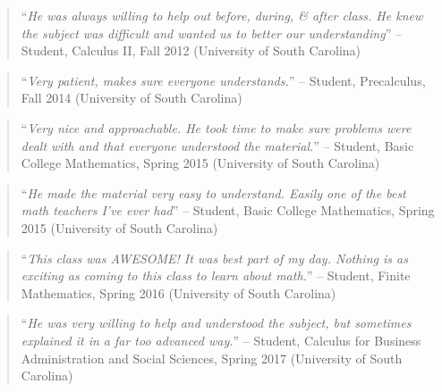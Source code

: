 \documentclass[teaching.portfolio.tex]{subfiles}
\begin{document}
\begin{quotation}
  ``\textit{He was always willing to help out before, during, \& after class.  He knew the subject was difficult and wanted us to better our understanding}'' -- Student, Calculus II, Fall 2012 (University of South Carolina)
\end{quotation}

\begin{quotation}
  ``\textit{Very patient, makes sure everyone understands.}'' -- Student, Precalculus, Fall 2014 (University of South Carolina)
\end{quotation}

\begin{quotation}
  ``\textit{Very nice and approachable.  He took time to make sure problems were dealt with and that everyone understood the material.}'' -- Student, Basic College Mathematics, Spring 2015 (University of South Carolina)
\end{quotation}

\begin{quotation}
  ``\textit{He made the material very easy to understand.  Easily one of the best math teachers I've ever had}'' -- Student, Basic College Mathematics, Spring 2015 (University of South Carolina)
\end{quotation}

\begin{quotation}
  ``\textit{This class was AWESOME!  It was best part of my day.  Nothing is as exciting as coming to this class to learn about math.}'' -- Student, Finite Mathematics, Spring 2016 (University of South Carolina)
\end{quotation}

\begin{quotation}
  ``\textit{He was very willing to help and understood the subject, but sometimes explained it in a far too advanced way.}'' -- Student, Calculus for Business Administration and Social Sciences, Spring 2017 (University of South Carolina)
\end{quotation}
\end{document}

